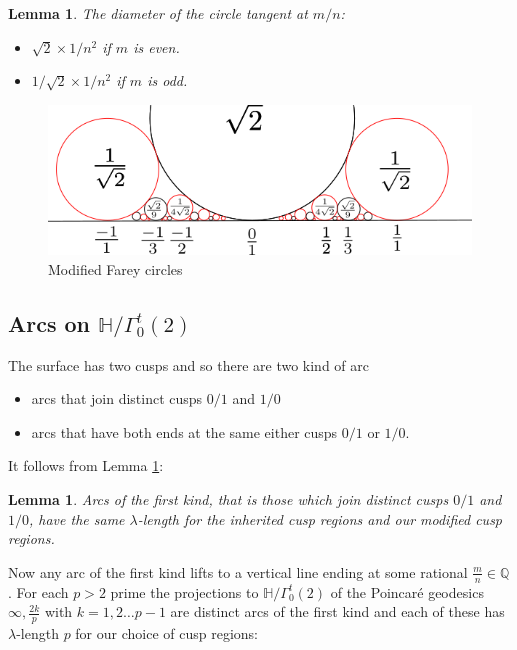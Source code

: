 \documentclass[12pt,a4paper]{amsart}
\newtheorem{lem}[thm]{Lemma}
\def\HH{\mathbb{H}}
\def\ah{\Gamma_0^t(2)}
\def\oot{\HH / \ah}
\def\QQ{\mathbb{Q}}
\begin{document}
\begin{lem}\label{new diameters}
	The diameter of the circle tangent at $m/n$:

\begin{itemize}
	\item $\sqrt 2 \times 1/ n^2$ if $m$ is even.
	\item $1/\sqrt 2 \times 1 / n^2$ if $m$ is odd.
\end{itemize}
\end{lem}

 \begin{figure}[H]
\begin{center}
\includegraphics[scale=1]{farey_mod.png} 
\end{center}
\caption{Modified Farey circles}
\label{modified farey}
\end{figure}

\subsection{Arcs on $\oot$}

The surface has two cusps and so there are two kind of arc
\begin{itemize}
	\item arcs that join distinct cusps $0/1$ and $1/0$
	\item arcs that have both ends at the same either
		cusps $0/1$ or $1/0$.
\end{itemize}
It follows from Lemma \ref{new diameters}:

\begin{lem}\label{new lambdas}
Arcs of the first kind,
that is those which join distinct cusps $0/1$ and $1/0$,
have the same $\lambda$-length for the inherited
cusp regions and our modified cusp regions. 
\end{lem}


Now any arc of the first kind lifts to a vertical line ending at
some rational $\frac{m}{n}\in \QQ$.
For each  $p>2$  prime 
the projections to $\oot$ of the Poincaré geodesics  $\infty,
\frac{2k}{p}$ with  $k = 1,2\ldots p-1$
are distinct arcs of the first kind 
and each of these has $\lambda$-length $p$ for our choice of cusp
regions:
\end{document}
